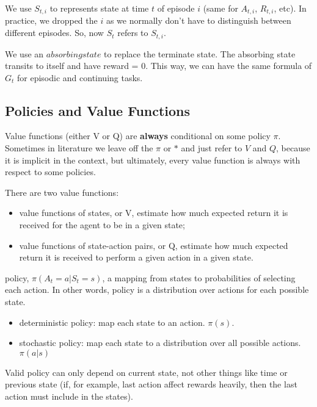 \documentclass[lang=en,mode=geye,device=normal,color=blue,14pt]{elegantnote}
\DeclareMathOperator*{\1}{\mathbbm{1}}
\begin{document}
We use $S_{t,i}$ to represents state at time $t$ of episode $i$ (same for $A_{t,i}$, $R_{t,i}$, etc).
In practice, we dropped the $i$ as we normally don't have to distinguish between different episodes.
So, now $S_t$ refers to $S_{t,i}$.

We use an $absorbing state$ to replace the terminate state. The absorbing state transits to itself and have reward = 0.
This way, we can have the same formula of $G_t$ for episodic and continuing tasks.

\subsection{Policies and Value Functions}

Value functions (either V or Q) are \textbf{always} conditional on some policy $\pi$. Sometimes in literature we leave off the $\pi$ or $*$ and just refer to $V$ and $Q$, because it is implicit in the context, but ultimately, every value function is always with respect to some policies.

\begin{definition}
There are two value functions:
\begin{itemize}
\item value functions of states, or V, estimate how much expected return it is received for the agent to be in a given state;
\item value functions of state-action pairs, or Q, estimate how much expected return it is received to perform a given action in a given state.
\end{itemize}
\end{definition}

\begin{definition}
policy, $\pi(A_t=a|S_t=s)$, a mapping from states to probabilities of selecting each action. In other words, policy is a distribution over actions for each possible state.
\end{definition}
\begin{itemize}
\item deterministic policy: map each state to an action. $\pi(s)$. 
\item stochastic policy: map each state to a distribution over all possible actions. $\pi(a|s)$
\end{itemize}
Valid policy can only depend on current state, not other things like time or previous state (if, for example, last action affect rewards heavily, then the last action must include in the states). 
\newline
\end{document}
